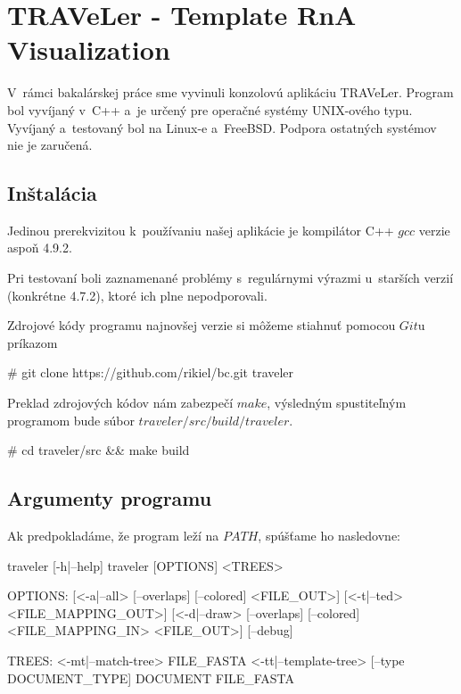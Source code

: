 
\newcommand{\paramI}[1]{\textit{-#1}}
\newcommand{\param}[1]{\textit{\--\--#1}}

\chapter{TRAVeLer - Template RnA Visualization}

V~rámci bakalárskej práce sme vyvinuli konzolovú aplikáciu TRAVeLer.
Program bol vyvíjaný v~C++ a~je určený pre operačné systémy UNIX-ového typu.
Vyvíjaný a~testovaný bol na Linux-e a~FreeBSD.
Podpora ostatných systémov nie je zaručená.





\section{Inštalácia}

Jedinou prerekvizitou k~používaniu našej aplikácie je kompilátor C++
$gcc$ verzie aspoň 4.9.2.

Pri testovaní boli zaznamenané problémy s~regulárnymi výrazmi u~starších verzií
(konkrétne 4.7.2), ktoré ich plne nepodporovali.

Zdrojové kódy programu najnovšej verzie si môžeme stiahnuť pomocou $Git$u príkazom
\begin{code}[frame=none]
# git clone https://github.com/rikiel/bc.git traveler
\end{code}

Preklad zdrojových kódov nám zabezpečí $make$, výsledným spustiteľným programom
bude súbor $traveler/src/build/traveler$.
\begin{code}[frame=none]
  # cd traveler/src && make build
\end{code}





\section{Argumenty programu}

Ak predpokladáme, že program leží na $PATH$, spúšťame ho nasledovne:

\begin{code}[frame=none]
traveler [-h|--help]
traveler [OPTIONS] <TREES>

OPTIONS:
  [<-a|--all> [--overlaps] [--colored] <FILE_OUT>]
  [<-t|--ted> <FILE_MAPPING_OUT>]
  [<-d|--draw> [--overlaps] [--colored] <FILE_MAPPING_IN> <FILE_OUT>]
  [--debug]

TREES:
  <-mt|--match-tree> FILE_FASTA
  <-tt|--template-tree> [--type DOCUMENT_TYPE] DOCUMENT FILE_FASTA
\end{code}

